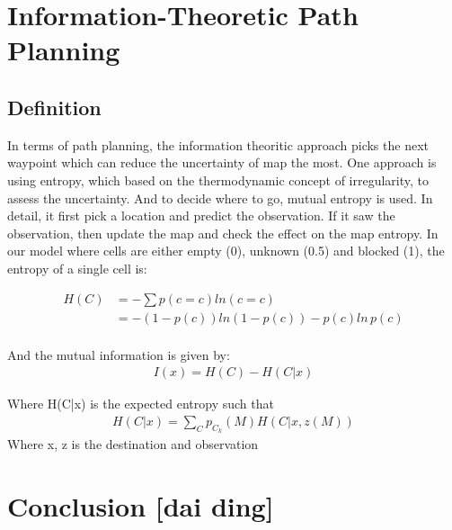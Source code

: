 \documentclass{article}
\begin{document}
\section{Information-Theoretic Path Planning}

\subsection {Definition}
In terms of path planning, the information theoritic approach picks the next waypoint which can reduce the uncertainty of map the most. One approach is using entropy, which based on the thermodynamic concept of irregularity, to assess the uncertainty. And to decide where to go, mutual entropy is used. In detail, it first pick a location and predict the observation. If it saw the observation, then update the map and check the effect on the map entropy. In our model where cells are either empty (0), unknown (0.5) and blocked (1), the entropy of a single cell is:

\begin{align}
H(C) &= - \sum p(c=c)ln(c=c) \\
         &= -(1-p(c))ln(1-p(c)) - p(c)ln\,p(c) \\
\end{align}

And the mutual information is given by:
\begin{align}
I(x) = H(C) - H(C|x) 
\end{align}

Where H(C|x) is the expected entropy  such that 
\begin{align}
H(C|x)= \sum_{C}p_{C_{k}} (M) H(C|x, z(M))
\end{align}
Where x, z is the destination and observation

\subsection{}

\subsection{}

\section{Conclusion [dai ding]}
\end{document}
